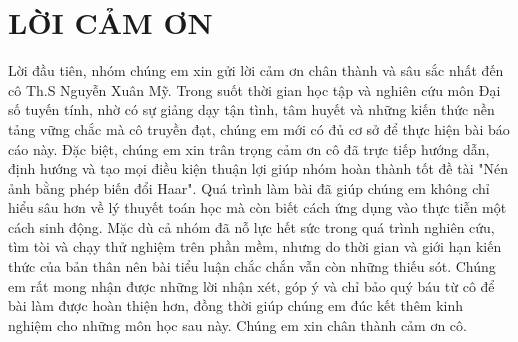 \section*{LỜI CẢM ƠN}

Lời đầu tiên, nhóm chúng em xin gửi lời cảm ơn chân thành và sâu sắc nhất đến 
cô Th.S Nguyễn Xuân Mỹ. Trong suốt thời gian học tập và nghiên cứu môn 
Đại số tuyến tính, nhờ có sự giảng dạy tận tình, tâm huyết 
và những kiến thức nền tảng vững chắc mà cô truyền đạt, 
chúng em mới có đủ cơ sở để thực hiện bài báo cáo này.
Đặc biệt, chúng em xin trân trọng cảm ơn cô đã trực tiếp hướng dẫn, 
định hướng và tạo mọi điều kiện thuận lợi giúp nhóm hoàn thành tốt đề tài 
"Nén ảnh bằng phép biến đổi Haar". Quá trình làm bài đã giúp chúng em 
không chỉ hiểu sâu hơn về lý thuyết toán học mà còn 
biết cách ứng dụng vào thực tiễn một cách sinh động.
Mặc dù cả nhóm đã nỗ lực hết sức trong quá trình nghiên cứu, 
tìm tòi và chạy thử nghiệm trên phần mềm, 
nhưng do thời gian và giới hạn kiến thức của bản thân 
nên bài tiểu luận chắc chắn vẫn còn những thiếu sót. 
Chúng em rất mong nhận được những lời nhận xét, 
góp ý và chỉ bảo quý báu từ cô để bài làm được hoàn thiện hơn, 
đồng thời giúp chúng em đúc kết thêm kinh nghiệm cho những môn học sau này.
Chúng em xin chân thành cảm ơn cô.
